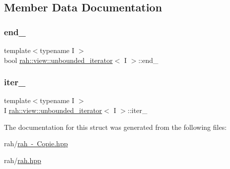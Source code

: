 \subsection{Member Data Documentation}
\mbox{\label{structrah_1_1view_1_1unbounded__iterator_a5af8d60be5952969ccbad7ef9ce670e4}} 
\subsubsection{\texorpdfstring{end\_}{end\_}}
{\footnotesize\ttfamily template$<$typename I $>$ \\
bool \mbox{\hyperlink{structrah_1_1view_1_1unbounded__iterator}{rah\+::view\+::unbounded\+\_\+iterator}}$<$ I $>$\+::end\+\_\+}

\mbox{\label{structrah_1_1view_1_1unbounded__iterator_a50affaae71d4122b92014b11763f6672}} 
\subsubsection{\texorpdfstring{iter\_}{iter\_}}
{\footnotesize\ttfamily template$<$typename I $>$ \\
I \mbox{\hyperlink{structrah_1_1view_1_1unbounded__iterator}{rah\+::view\+::unbounded\+\_\+iterator}}$<$ I $>$\+::iter\+\_\+}



The documentation for this struct was generated from the following files\+:\begin{DoxyCompactItemize}
\item 
rah/\mbox{\hyperlink{rah_01-_01_copie_8hpp}{rah -\/ Copie.\+hpp}}\item 
rah/\mbox{\hyperlink{rah_8hpp}{rah.\+hpp}}\end{DoxyCompactItemize}
